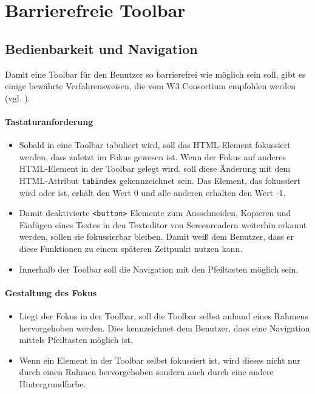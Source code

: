 \section{Barrierefreie Toolbar}
\subsection{Bedienbarkeit und Navigation}
Damit eine Toolbar für den Benutzer so barrierefrei wie möglich sein soll, gibt es einige bewährte Verfahrensweisen, 
die vom W3 Consortium empfohlen werden (vgl. \cite{accessible_toolbar_2020}).

\paragraph{Tastaturanforderung}

\begin{itemize}
	\item Sobald in eine Toolbar tabuliert wird, soll das HTML-Element fokussiert werden, dass zuletzt im Fokus 
		gewesen ist. Wenn der Fokus auf anderes HTML-Element in der Toolbar gelegt wird, soll diese 
		Änderung mit dem HTML-Attribut \texttt{tabindex} gekennzeichnet sein. Das Element, das fokussiert wird 	
		oder ist, erhält den Wert 0 und alle anderen erhalten den Wert -1.
	\item Damit deaktivierte \texttt{<button>} Elemente zum Ausschneiden, Kopieren und Einfügen eines Textes in 
		den Texteditor von Screenreadern weiterhin erkannt werden, sollen sie fokussierbar bleiben. Damit weiß
		dem Benutzer, dass er diese Funktionen zu einem späteren Zeitpunkt nutzen kann.
	\item Innerhalb der Toolbar soll die Navigation mit den Pfeiltasten möglich sein. 
\end{itemize}

\paragraph{Gestaltung des Fokus}

\begin{itemize}
	\item Liegt der Fokus in der Toolbar, soll die Toolbar selbst anhand eines Rahmens hervorgehoben werden. Dies
		kennzeichnet dem Benutzer, dass eine Navigation mittels Pfeiltasten möglich ist.
	\item Wenn ein Element in der Toolbar selbst fokussiert ist, wird dieses nicht nur durch einen Rahmen 	
		hervorgehoben sondern auch durch eine andere Hintergrundfarbe.
\end{itemize}


